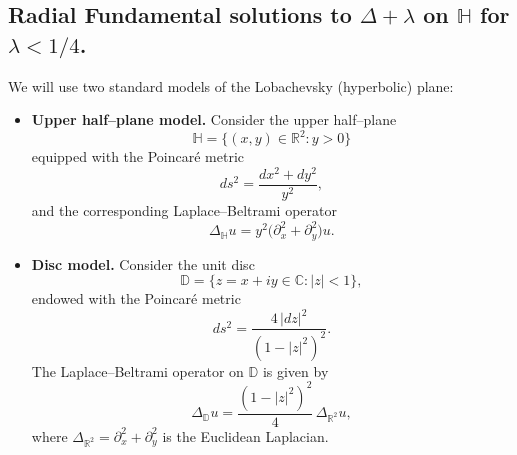 \documentclass{article}
\begin{document}
\subsection*{Radial Fundamental solutions to $\Delta + \lambda $ on $\mathbb{H}$ for $\lambda <1/4$.}


We will use two standard models of the Lobachevsky (hyperbolic) plane:

\begin{itemize}
    \item \textbf{Upper half–plane model.}
    Consider the upper half–plane
    \[
    \mathbb H = \{(x,y)\in\mathbb R^2 : y>0\}
    \]
    equipped with the Poincaré metric
    \[
    ds^2 = \frac{dx^2 + dy^2}{y^2},
    \]
    and the corresponding Laplace–Beltrami operator
    \[
    \Delta_{\mathbb H} u
      = y^{2}\bigl(\partial_x^{2} + \partial_y^{2}\bigr)u.
    \]

    \item \textbf{Disc model.}
    Consider the unit disc
    \[
    \mathbb{D} = \{z = x + iy \in \mathbb{C} : |z|<1\},
    \]
    endowed with the Poincaré metric
    \[
    ds^2 = \frac{4\,|dz|^2}{(1 - |z|^2)^2}.
    \]
    The Laplace–Beltrami operator on $\mathbb{D}$ is given by
    \[
    \Delta_{\mathbb{D}} u
      = \frac{(1 - |z|^2)^2}{4}\,\Delta_{\mathbb{R}^2} u,
    \]
    where $\Delta_{\mathbb{R}^2} = \partial_x^2 + \partial_y^2$ is the Euclidean Laplacian.
\end{itemize}
\end{document}
